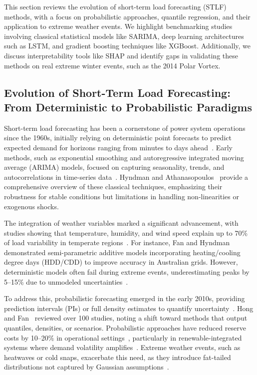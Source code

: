 \documentclass[12pt,a4paper]{article}
\begin{document}
This section reviews the evolution of short-term load forecasting (STLF) methods, with a focus on probabilistic approaches, quantile regression, and their application to extreme weather events. We highlight benchmarking studies involving classical statistical models like SARIMA, deep learning architectures such as LSTM, and gradient boosting techniques like XGBoost. Additionally, we discuss interpretability tools like SHAP and identify gaps in validating these methods on real extreme winter events, such as the 2014 Polar Vortex.

\subsection{Evolution of Short-Term Load Forecasting: From Deterministic to Probabilistic Paradigms}

Short-term load forecasting has been a cornerstone of power system operations since the 1960s, initially relying on deterministic point forecasts to predict expected demand for horizons ranging from minutes to days ahead~\cite{hyndman2010density,nowotarski2018recent}. Early methods, such as exponential smoothing and autoregressive integrated moving average (ARIMA) models, focused on capturing seasonality, trends, and autocorrelations in time-series data~\cite{hong2016probabilistic,hong2016tutorial}. Hyndman and Athanasopoulos~\cite{hyndman2018forecasting} provide a comprehensive overview of these classical techniques, emphasizing their robustness for stable conditions but limitations in handling non-linearities or exogenous shocks.

The integration of weather variables marked a significant advancement, with studies showing that temperature, humidity, and wind speed explain up to 70\% of load variability in temperate regions~\cite{chen2016xgboost,hochreiter1997long}. For instance, Fan and Hyndman~\cite{fan2012shortterm} demonstrated semi-parametric additive models incorporating heating/cooling degree days (HDD/CDD) to improve accuracy in Australian grids. However, deterministic models often fail during extreme events, underestimating peaks by 5--15\% due to unmodeled uncertainties~\cite{arora2018rule,gaillard2016additive}.

To address this, probabilistic forecasting emerged in the early 2010s, providing prediction intervals (PIs) or full density estimates to quantify uncertainty~\cite{xie2015probabilistic,koenker1978regression}. Hong and Fan~\cite{hong2016tutorial} reviewed over 100 studies, noting a shift toward methods that output quantiles, densities, or scenarios. Probabilistic approaches have reduced reserve costs by 10--20\% in operational settings~\cite{weron2014electricity,haben2015semiparametric}, particularly in renewable-integrated systems where demand volatility amplifies~\cite{taylor2010triple}. Extreme weather events, such as heatwaves or cold snaps, exacerbate this need, as they introduce fat-tailed distributions not captured by Gaussian assumptions~\cite{cancelo2008forecasting,dudek2015neural}.
\end{document}
